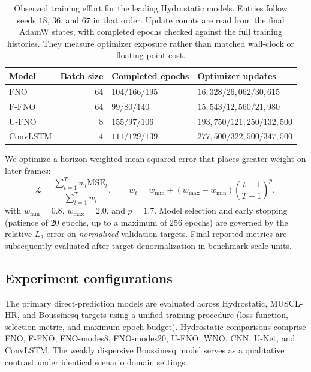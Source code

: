 \begin{table}[pos=!htbp]
\centering
\caption{Observed training effort for the leading Hydrostatic models. Entries follow seeds $18$, $36$, and $67$ in that order. Update counts are read from the final AdamW states, with completed epochs checked against the full training histories. They measure optimizer exposure rather than matched wall-clock or floating-point cost.}
\label{tab:leading-training-budget}
\small
\setlength{\tabcolsep}{4pt}
\begin{tabular}{lrll}
    \toprule
    Model & Batch size & Completed epochs & Optimizer updates \\
    \midrule
    FNO & $64$ & $104 / 166 / 195$ & $16{,}328 / 26{,}062 / 30{,}615$ \\
    F-FNO & $64$ & $99 / 80 / 140$ & $15{,}543 / 12{,}560 / 21{,}980$ \\
    U-FNO & $8$ & $155 / 97 / 106$ & $193{,}750 / 121{,}250 / 132{,}500$ \\
    ConvLSTM & $4$ & $111 / 129 / 139$ & $277{,}500 / 322{,}500 / 347{,}500$ \\
    \bottomrule
\end{tabular}
\end{table}

We optimize a horizon-weighted mean-squared error that places greater weight on later frames:
\begin{equation}
\mathcal{L} = \frac{\sum_{t=1}^{T} w_t \mathrm{MSE}_t}{\sum_{t=1}^{T} w_t}, \qquad w_t = w_{\min} + (w_{\max} - w_{\min})\!\left(\frac{t - 1}{T - 1}\right)^p,
\end{equation}
with $w_{\min} = 0.8$, $w_{\max} = 2.0$, and $p = 1.7$. Model selection and early stopping (patience of 20 epochs, up to a maximum of 256 epochs) are governed by the relative $L_2$ error on \emph{normalized} validation targets. Final reported metrics are subsequently evaluated after target denormalization in benchmark-scale units.

\FloatBarrier
\subsection{Experiment configurations}
\label{subsec:train-configs}
The primary direct-prediction models are evaluated across Hydrostatic, MUSCL-HR, and Boussinesq targets using a unified training procedure (loss function, selection metric, and maximum epoch budget). Hydrostatic comparisons comprise FNO, F-FNO, FNO-modes8, FNO-modes20, U-FNO, WNO, CNN, U-Net, and ConvLSTM. The weakly dispersive Boussinesq model serves as a qualitative contrast under identical scenario domain settings.

